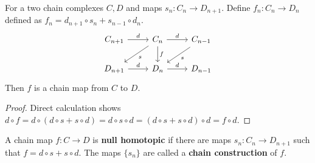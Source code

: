 \begin{prop} For a two chain complexes $C,D$ and maps $s_n:C_n\rightarrow D_{n+1}$. Define $f_n:C_n\rightarrow D_n$ defined as $f_n=d_{n+1}\circ s_n+s_{n-1}\circ d_n$.
\begin{equation}
\begin{tikzcd}
C_{n+1}\arrow{r}{d} &C_n\arrow{r}{d}\arrow{d}{f}\arrow{ld}{s} & C_{n-1}\arrow{ld}{s}\\
D_{n+1}\arrow{r}{d} &D_n\arrow{r}{d}& D_{n-1}
\end{tikzcd}
\end{equation}
Then $f$ is a chain map from $C$ to $D$.
\end{prop}
\begin{proof} Direct calculation shows $d\circ f=d\circ (d\circ s+s\circ d)=d\circ s\circ d=(d\circ s+s\circ d)\circ d=f\circ d$.
\end{proof}

\begin{defn} A chain map $f:C\rightarrow D$ is \textbf{null homotopic} if there are maps $s_n:C_n\rightarrow D_{n+1}$ such that $f=d\circ s+s\circ d$. The maps $\{s_n\}$ are called a \textbf{chain construction} of $f$.
\end{defn}


